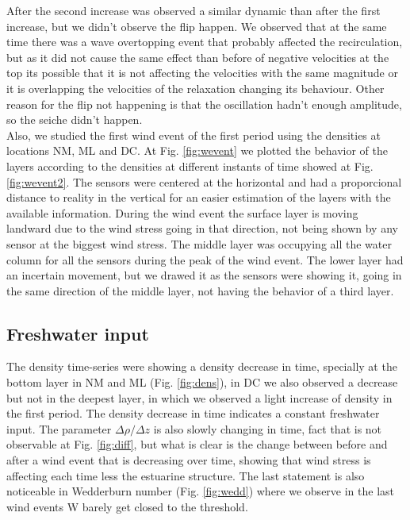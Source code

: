 \documentclass[tesis.tex]{subfiles}
\begin{document}
After the second increase was observed a similar dynamic than after the first increase, but we didn't observe the flip happen. We observed that at the same time there was a wave overtopping event that probably affected the recirculation, but as it did not cause the same effect than before of negative velocities at the top its possible that it is not affecting the velocities with the same magnitude or it is overlapping the velocities of the relaxation changing its behaviour. Other reason for the flip not happening is that the oscillation hadn't enough amplitude, so the seiche didn't happen.\\

Also, we studied the first wind event of the first period using the densities at locations NM, ML and DC. At Fig. \ref{fig:wevent} we plotted the behavior of the layers according to the densities at different instants of time showed at Fig. \ref{fig:wevent2}. The sensors were centered at the horizontal and had a proporcional distance to reality in the vertical for an easier estimation of the layers with the available information. During the wind event the surface layer is moving landward due to the wind stress going in that direction, not being shown by any sensor at the biggest wind stress. The middle layer was occupying all the water column for all the sensors during the peak of the wind event. The lower layer had an incertain movement, but we drawed it as the sensors were showing it, going in the same direction of the middle layer, not having the behavior of a third layer.\\

\subsection{Freshwater input}

The density time-series were showing a density decrease in time, specially at the bottom layer in NM and ML (Fig. \ref{fig:dens}), in DC we also observed a decrease but not in the deepest layer, in which we observed a light increase of density in the first period. The density decrease in time indicates a constant freshwater input. The parameter $\Delta \rho / \Delta z$ is also slowly changing in time, fact that is not observable at Fig. \ref{fig:diff}, but what is clear is the change between before and after a wind event that is decreasing over time, showing that wind stress is affecting each time less the estuarine structure. The last statement is also noticeable in Wedderburn number (Fig. \ref{fig:wedd}) where we observe in the last wind events W barely get closed to the threshold.\\
\end{document}
